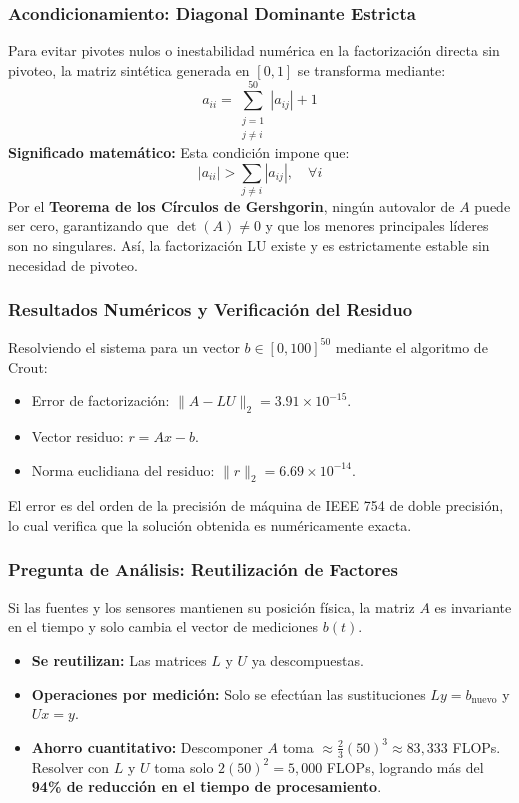 \documentclass[11pt,a4paper]{article}
\theoremstyle{definition}
\theoremstyle{remark}
\begin{document}
\subsubsection{Acondicionamiento: Diagonal Dominante Estricta}
Para evitar pivotes nulos o inestabilidad numérica en la factorización directa sin pivoteo, la matriz sintética generada en $[0, 1]$ se transforma mediante:
\begin{equation}
    a_{ii} = \sum_{\substack{j=1 \\ j \neq i}}^{50} |a_{ij}| + 1
\end{equation}
\textbf{Significado matemático:} Esta condición impone que:
\begin{equation}
    |a_{ii}| > \sum_{j \neq i} |a_{ij}|, \quad \forall i
\end{equation}
Por el \textbf{Teorema de los Círculos de Gershgorin}, ningún autovalor de $A$ puede ser cero, garantizando que $\det(A) \neq 0$ y que los menores principales líderes son no singulares. Así, la factorización LU existe y es estrictamente estable sin necesidad de pivoteo.

\subsubsection{Resultados Numéricos y Verificación del Residuo}
Resolviendo el sistema para un vector $b \in [0, 100]^{50}$ mediante el algoritmo de Crout:
\begin{itemize}[leftmargin=*]
    \item Error de factorización: $\|A - LU\|_2 = 3.91 \times 10^{-15}$.
    \item Vector residuo: $r = Ax - b$.
    \item Norma euclidiana del residuo: $\|r\|_2 = 6.69 \times 10^{-14}$.
\end{itemize}
El error es del orden de la precisión de máquina de IEEE 754 de doble precisión, lo cual verifica que la solución obtenida es numéricamente exacta.

\subsubsection{Pregunta de Análisis: Reutilización de Factores}
Si las fuentes y los sensores mantienen su posición física, la matriz $A$ es invariante en el tiempo y solo cambia el vector de mediciones $b(t)$.
\begin{itemize}[leftmargin=*]
    \item \textbf{Se reutilizan:} Las matrices $L$ y $U$ ya descompuestas.
    \item \textbf{Operaciones por medición:} Solo se efectúan las sustituciones $Ly = b_{\text{nuevo}}$ y $Ux = y$.
    \item \textbf{Ahorro cuantitativo:} Descomponer $A$ toma $\approx \frac{2}{3}(50)^3 \approx 83{,}333$ FLOPs. Resolver con $L$ y $U$ toma solo $2(50)^2 = 5{,}000$ FLOPs, logrando más del \textbf{94\% de reducción en el tiempo de procesamiento}.
\end{itemize}
\end{document}
